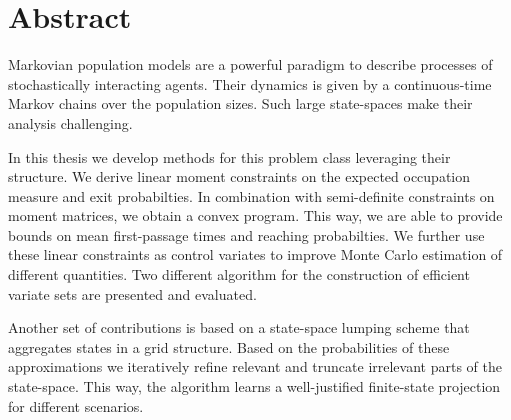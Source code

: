 
\chapter*{Abstract}
Markovian population models are a powerful paradigm to describe processes of stochastically interacting agents. Their dynamics is given by a continuous-time Markov chains over the population sizes. Such large state-spaces make their analysis challenging.

In this thesis we develop methods for this problem class leveraging their structure. We derive linear moment constraints on the expected occupation measure and exit probabilties. In combination with semi-definite constraints on moment matrices, we obtain a convex program. This way, we are able to provide bounds on mean first-passage times and reaching probabilties. We further use these linear constraints as control variates to improve Monte Carlo estimation of different quantities. Two different algorithm for the construction of efficient variate sets are presented and evaluated.

Another set of contributions is based on a state-space lumping scheme that aggregates states in a grid structure. Based on the probabilities of these approximations we iteratively refine relevant and truncate irrelevant parts of the state-space. This way, the algorithm learns a well-justified finite-state projection for different scenarios.

\cleardoublepage

